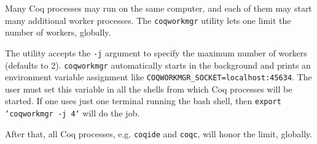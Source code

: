 Many Coq processes may run on the same computer, and each of them may start
many additional worker processes.
The \texttt{coqworkmgr} utility lets one limit the number of workers, globally.

The utility accepts the \texttt{-j} argument to specify the maximum number of
workers (defaults to 2). \texttt{coqworkmgr} automatically starts in the
background and prints an environment variable assignment like
\texttt{COQWORKMGR\_SOCKET=localhost:45634}. The user must set this variable in
all the shells from which Coq processes will be started.  If one uses just
one terminal running the bash shell, then \texttt{export `coqworkmgr -j 4`} will
do the job.

After that, all Coq processes, e.g. \texttt{coqide} and \texttt{coqc},
will honor the limit, globally.


